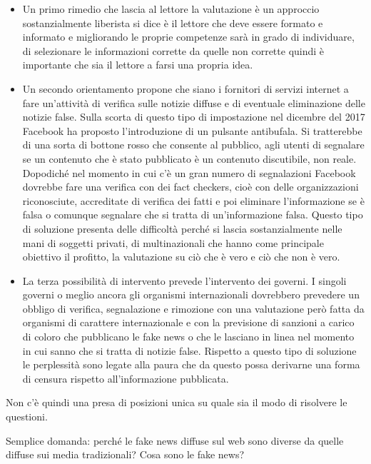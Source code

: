 \begin{itemize}
    \item Un primo rimedio che lascia al lettore la valutazione è un approccio sostanzialmente liberista si dice è il lettore che deve essere formato e informato e migliorando le proprie competenze sarà in grado di individuare, di selezionare le informazioni corrette da quelle non corrette quindi è importante che sia il lettore a farsi una propria idea. 
    \item Un secondo orientamento propone che siano i fornitori di servizi internet a fare un'attività di verifica sulle notizie diffuse e di eventuale eliminazione delle notizie false. Sulla scorta di questo tipo di impostazione nel dicembre del 2017 Facebook ha proposto l'introduzione di un pulsante antibufala. Si tratterebbe di una sorta di bottone rosso che consente al pubblico, agli utenti di segnalare se un contenuto che è stato pubblicato è un contenuto discutibile, non reale. Dopodiché nel momento in cui c'è un gran numero di segnalazioni Facebook dovrebbe fare una verifica con dei fact checkers, cioè con delle organizzazioni riconosciute, accreditate di verifica dei fatti e poi eliminare l'informazione se è falsa o comunque segnalare che si tratta di un'informazione falsa. Questo tipo di soluzione presenta delle difficoltà perché si lascia sostanzialmente nelle mani di soggetti privati, di multinazionali che hanno come principale obiettivo il profitto, la valutazione su ciò che è vero e ciò che non è vero.
    \item La terza possibilità di intervento prevede l'intervento dei governi. I singoli governi o meglio ancora gli organismi internazionali dovrebbero prevedere un obbligo di verifica, segnalazione e rimozione con una valutazione però fatta da organismi di carattere internazionale e con la previsione di sanzioni a carico di coloro che pubblicano le fake news o che le lasciano in linea nel momento in cui sanno che si tratta di notizie false. Rispetto a questo tipo di soluzione le perplessità sono legate alla paura che da questo possa derivarne una forma di censura rispetto all'informazione pubblicata. 
\end{itemize} 

Non c'è quindi una presa di posizioni unica su quale sia il modo di risolvere le questioni.

Semplice domanda: perché le fake news diffuse sul web sono diverse da quelle diffuse sui media tradizionali? Cosa sono le fake news? 





